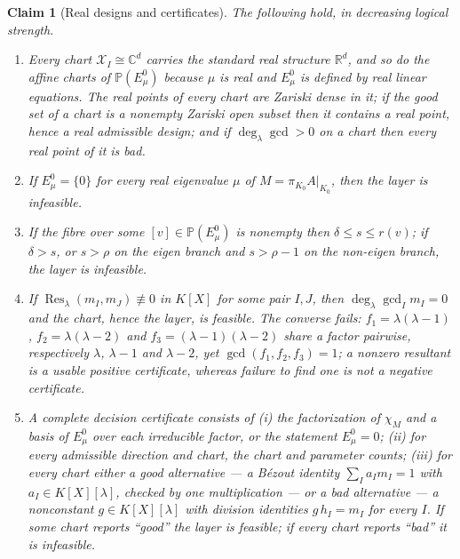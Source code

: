 \documentclass[journal]{IEEEtran}
\theoremstyle{plainn}
\newtheorem{claim}{Claim}
\theoremstyle{remark}
\begin{document}
\begin{claim}[Real designs and certificates]
\label{sec4:prop:realpoints}
\label{sec4:prop:sieve}
\label{sec4:prop:dimineq}
\label{sec4:prop:resultant}
\label{sec4:prop:cert}
The following hold, in decreasing logical strength.
\begin{enumerate}[label=(\alph*),leftmargin=*]
\item \label{it:real} Every chart $\mathcal X_I\cong\mathbb C^d$ carries the standard real structure
$\mathbb R^d$, and so do the affine charts of $\mathbb P(E_\mu^0)$ because $\mu$ is real and $E_\mu^0$
is defined by real linear equations. The real points of every chart are Zariski dense in it; if the
good set of a chart is a nonempty Zariski open subset then it contains a real point, hence a real
admissible design; and if $\deg_\lambda\gcd>0$ on a chart then every real point of it is bad.
\item \label{it:sieve} If $E_\mu^0=\{0\}$ for every real eigenvalue $\mu$ of
$M=\pi_{K_0}A|_{K_0}$, then the layer is infeasible.
\item \label{it:dimineq} If the fibre over some $[v]\in\mathbb P(E_\mu^0)$ is nonempty then
$\delta\le s\le r(v)$; if $\delta>s$, or $s>\rho$ on the eigen branch and $s>\rho-1$ on the non-eigen
branch, the layer is infeasible.
\item \label{it:resultant} If $\operatorname{Res}_\lambda(m_I,m_J)\not\equiv0$ in $K[X]$ for some pair
$I,J$, then $\deg_\lambda\gcd_I m_I=0$ and the chart, hence the layer, is feasible. The converse fails:
$f_1=\lambda(\lambda-1)$, $f_2=\lambda(\lambda-2)$ and $f_3=(\lambda-1)(\lambda-2)$ share a factor
pairwise, respectively $\lambda$, $\lambda-1$ and $\lambda-2$, yet $\gcd(f_1,f_2,f_3)=1$; a nonzero
resultant is a usable positive certificate, whereas failure to find one is not a negative certificate.
\item \label{it:cert} A complete decision certificate consists of (i) the factorization of $\chi_M$ and
a basis of $E_\mu^0$ over each irreducible factor, or the statement $E_\mu^0=0$; (ii) for every
admissible direction and chart, the chart and parameter counts; (iii) for every chart either a
\emph{good} alternative --- a Bézout identity $\sum_I a_I m_I=1$ with $a_I\in K[X][\lambda]$, checked
by one multiplication --- or a \emph{bad} alternative --- a nonconstant $g\in K[X][\lambda]$ with
division identities $g\,h_I=m_I$ for every $I$. If some chart reports ``good'' the layer is feasible;
if every chart reports ``bad'' it is infeasible.
\end{enumerate}
\end{claim}
\end{document}
